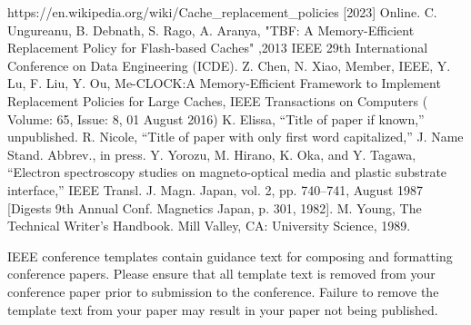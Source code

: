 \documentclass[conference]{IEEEtran}
\begin{document}
\begin{thebibliography}{00}
	 https://en.wikipedia.org/wiki/Cache\_replacement\_policies [2023] Online.
	 C. Ungureanu, B. Debnath, S. Rago, A. Aranya, "TBF: A Memory-Efficient Replacement Policy for Flash-based Caches" ,2013 IEEE 29th International Conference on Data Engineering (ICDE). 
	 Z. Chen, N. Xiao, Member, IEEE, Y. Lu, F. Liu, Y. Ou, Me-CLOCK:A Memory-Efficient Framework to Implement Replacement Policies for Large Caches, IEEE Transactions on Computers ( Volume: 65, Issue: 8, 01 August 2016)
	 K. Elissa, ``Title of paper if known,'' unpublished.
	 R. Nicole, ``Title of paper with only first word capitalized,'' J. Name Stand. Abbrev., in press.
	 Y. Yorozu, M. Hirano, K. Oka, and Y. Tagawa, ``Electron spectroscopy studies on magneto-optical media and plastic substrate interface,'' IEEE Transl. J. Magn. Japan, vol. 2, pp. 740--741, August 1987 [Digests 9th Annual Conf. Magnetics Japan, p. 301, 1982].
	 M. Young, The Technical Writer's Handbook. Mill Valley, CA: University Science, 1989.
\end{thebibliography}
\vspace{12pt}
\color{red}
IEEE conference templates contain guidance text for composing and formatting conference papers. Please ensure that all template text is removed from your conference paper prior to submission to the conference. Failure to remove the template text from your paper may result in your paper not being published.
\end{document}
